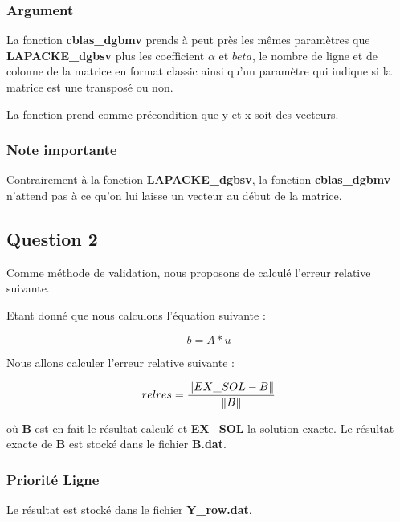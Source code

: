 \documentclass[11pt]{article}
\DeclarePairedDelimiter{\norm}{\lVert}{\rVert}
\begin{document}
\subsubsection{Argument}

La fonction \textbf{cblas\_dgbmv} prends à peut près les mêmes
paramètres que \textbf{LAPACKE\_dgbsv} plus les coefficient $\alpha$
et $beta$, le nombre de ligne et de colonne de la matrice en format
classic ainsi qu'un paramètre qui indique si la matrice est une
transposé ou non.\newline

La fonction prend comme précondition que y et x soit des vecteurs.

\subsubsection{Note importante}

Contrairement à la fonction \textbf{LAPACKE\_dgbsv}, la fonction
\textbf{cblas\_dgbmv} n'attend pas à ce qu'on lui laisse un vecteur au
début de la matrice.

\subsection{Question 2}

Comme méthode de validation, nous proposons de calculé l'erreur
relative suivante.\newline

Etant donné que nous calculons l'équation suivante :

\begin{equation*}
b = A * u
\end{equation*}

Nous allons calculer l'erreur relative suivante :

\begin{equation*}
relres = \frac{\norm{EX\_SOL - B}}{\norm{B}}
\end{equation*}

où \textbf{B} est en fait le résultat calculé et \textbf{EX\_SOL} la
solution exacte.\newline
Le résultat exacte de \textbf{B} est stocké dans le fichier \textbf{B.dat}.

\subsubsection{Priorité Ligne}

Le résultat est stocké dans le fichier \textbf{Y\_row.dat}.\newline
\end{document}
